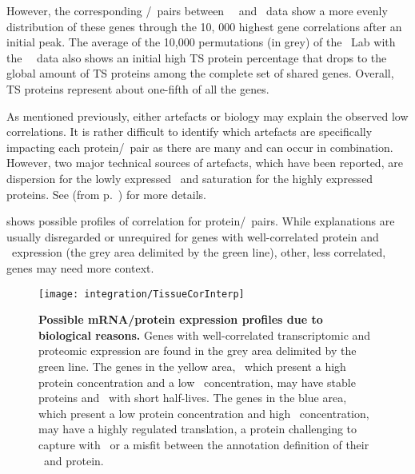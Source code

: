 However,
the corresponding \mRNA/\mRNA\ pairs between \uhlen\ \etal\ and \gtex\ data
show a more evenly distribution of these genes
through the 10, 000 highest gene correlations after an initial peak.
The average of the 10,000 permutations (in grey) of the \pandey\ Lab
with the \uhlen\ \etal\ data also shows
an initial high \gls{TS} protein percentage that drops
to the global amount of \gls{TS} proteins among the complete set of shared genes.
Overall, \gls{TS} proteins represent about one-fifth of all the genes.

As mentioned previously,
either artefacts or biology may explain the observed low correlations.
It is rather difficult to identify
which artefacts are specifically impacting each protein/\mRNA\ pair
as there are many and can occur in combination.
However, two major technical sources of artefacts,
which have been reported,
are dispersion for the lowly expressed \mRNAs\ and
saturation for the highly expressed proteins.
See  (from p.~\pageref{sec:transExplo})
for more details.

 shows possible profiles of correlation for
protein/\mRNA\ pairs.
While explanations are usually disregarded or unrequired for genes
with well-correlated protein and \mRNA\ expression
(the grey area delimited by the green line),
other, less correlated, genes may need more context.

\begin{figure}[!htb]
    \texttt{[image: integration/TissueCorInterp]}\centering
    \vspace{-3mm}
    \caption[Possible mRNA/protein expression profiles
    due to biological reasons.]{\label{fig:CorImprovable}%
    \textbf{Possible mRNA/protein expression profiles due to biological reasons.}
    Genes with well-correlated transcriptomic and proteomic expression
    are found in the grey area delimited by the green line.
    The genes in the yellow area,
    \ie\ which present a high protein concentration and a low \mRNA\ concentration,
    may have stable proteins and \mRNAs\ with short half-lives.
    The genes in the blue area,
    which present a low protein concentration and high \mRNA\ concentration,
    may have a highly regulated translation,
    a protein challenging to capture with \ms\,
    or a misfit between the annotation definition of their \mRNA\ and protein.
    }
\end{figure}

